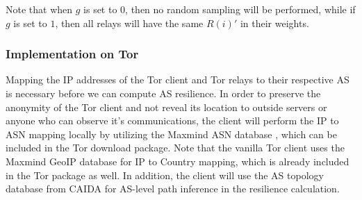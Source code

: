 %
%

Note that when $g$ is set to $0$, then no random sampling will be performed, while if $g$ is set to $1$, then all relays will have the same $R(i)\prime$ in their weights. 


\subsubsection{Implementation on Tor}
Mapping the IP addresses of the Tor client and Tor relays to their respective AS is necessary before we can compute AS resilience. In order to preserve the anonymity of the Tor client and not reveal its location to outside servers or anyone who can observe it's communications, the client will perform the IP to ASN mapping locally by utilizing the Maxmind ASN database , which can be included in the Tor download package. Note that the vanilla Tor client uses the Maxmind GeoIP database for IP to Country mapping, which is already included in the Tor package as well. In addition, the client will use the AS topology database from CAIDA \cite{caida} for AS-level path inference in the resilience calculation. 

